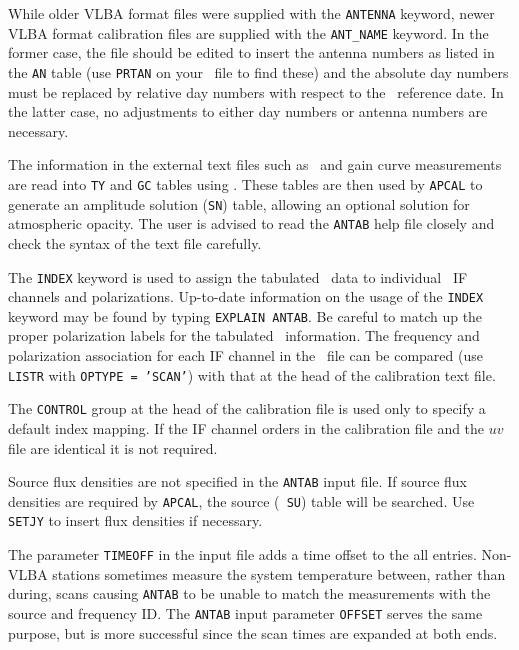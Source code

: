 While older VLBA format  files were supplied with
the {\tt ANTENNA} keyword, newer VLBA format calibration files are
supplied with the {\tt ANT\_NAME} keyword.  In the former case, the
file should be edited to insert the antenna numbers as listed in the
{\tt AN} table (use {\tt PRTAN} on your \AIPS\ file to find these) and
the absolute day numbers must be replaced by relative day numbers with
respect to the \AIPS\ reference date.  In the latter case, no
adjustments to either day numbers or antenna numbers are necessary.


The  information in the external text files such as
\Tsys\ and gain curve measurements are read into {\tt TY} and
{\tt GC} tables using {\tt {}}\@.  These tables are then
used by {\tt APCAL} to generate an amplitude solution ({\tt SN})
table, allowing an optional solution for atmospheric opacity.  The
user is advised to read the {\tt ANTAB} help file closely and check
the syntax of the text file carefully.

The {\tt INDEX} keyword is used to assign the tabulated \Tsys\
data to individual \AIPS\ IF channels and polarizations. Up-to-date
information on the usage of the {\tt INDEX} keyword may be found by
typing {\tt EXPLAIN ANTAB}\@.  Be careful to match up the proper
polarization labels for the tabulated \Tsys\ information. The
frequency and polarization association for each IF channel in the
\AIPS\ file can be compared (use {\tt LISTR} with {\tt OPTYPE =
'SCAN'}) with that at the head of the calibration text file.

The {\tt CONTROL} group at the head of the calibration file is used
only to specify a default index mapping.  If the IF channel orders in
the calibration file and the $uv$ file are identical it is not
required.

Source flux densities are not specified in the {\tt ANTAB} input file.
If source flux densities are required by {\tt APCAL}, the source ({\tt
SU}) table will be searched.  Use {\tt SETJY} to insert flux densities
if necessary.

The parameter {\tt TIMEOFF} in the input file adds a time offset to
the all entries. Non-VLBA stations sometimes measure the system
temperature between, rather than during, scans causing {\tt ANTAB} to
be unable to match the measurements with the source and frequency
ID\@.  The {\tt ANTAB} input parameter {\tt OFFSET} serves the same
purpose, but is more successful since the scan times are expanded at
both ends.

